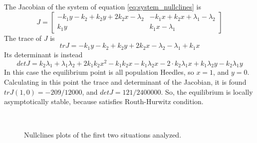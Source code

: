 The Jacobian of the system of equation \ref{eq:system_nullclines} is
\begin{equation}
J = \begin{bmatrix}
	-k_1 y -k_2 +k_2 y+2 k_2 x- \lambda_2 & -k_1 x + k_2 x + \lambda_1-\lambda_2 \\
	k_1 y & k_1 x - \lambda_1
\end{bmatrix}
\end{equation}
The trace of $J$ is
\begin{equation}
	trJ = -k_1 y -k_2 +k_2y + 2 k_2 x - \lambda_2 -\lambda_1 +k_1 x
\end{equation}
Its determinant is instead
\begin{equation}
	detJ = k_2 \lambda_1 + \lambda_1 \lambda_2 + 2 k_1 k_2 x^2 - k_1 k_2 x - k_1 \lambda_2 x - 2\cdot k_2 \lambda_1 x + k_1 \lambda_2 y - k_2 \lambda_1 y
\end{equation}
In this case the equilibrium point is all population Heedles, so $x = 1$, and $y = 0$. Calculating in this point the trace and determinant of the Jacobian, it is found $trJ(1,0) =-209/12000$, and $detJ = 121/2400000$. So, the equilibrium is locally asymptotically stable, because satisfies Routh-Hurwitz condition. 
\begin{figure}[h]
	\centering
	 \quad
	 \\
	\caption[Nullclines first figure]{Nullclines plots of the first two situations analyzed.}
	\label{fig:r1r2less1dyn}
\end{figure}

